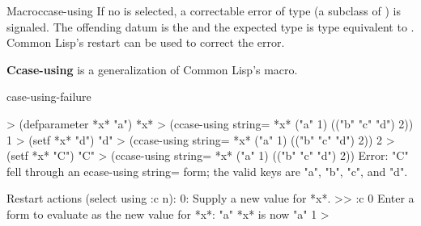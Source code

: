 \documentclass[10pt,twoside,english,pdftex]{article}
\begin{document}
\begin{functiondoc}{Macro}{ccase-using}{%
    }
%
%
%
%
If no  is selected, a correctable error of type
 (a subclass of ) is
signaled. The offending datum is the  and the expected
type is type equivalent to . Common Lisp's 
restart can be used to correct the error.

\textbf{Ccase-using} is a generalization of Common Lisp's 
macro.

\begin{alsos}{case-using-failure}
\end{alsos}

\fnexamples
%
\W\supp
\begin{example}
  > (defparameter *x* "a")
  *x*
  > (ccase-using string= *x*
      ("a" 1)
      (("b" "c" "d") 2))
  1
  > (setf *x* "d")
  "d"
  > (ccase-using string= *x*
      ("a" 1)
      (("b" "c" "d") 2))
  2\goodpagebreak
  > (setf *x* "C")
  "C"\goodpagebreak
  > (ccase-using string= *x*
      ("a" 1)
      (("b" "c" "d") 2))
  Error: "C" fell through an ecase-using string= form; 
         the valid keys are "a", "b", "c", and "d".

  Restart actions (select using :c n):
    0: Supply a new value for *x*.
  >> :c 0
  Enter a form to evaluate as the new value for *x*: "a"
  *x* is now "a"
  1
  >
\end{example}

\end{functiondoc}

\end{document}
